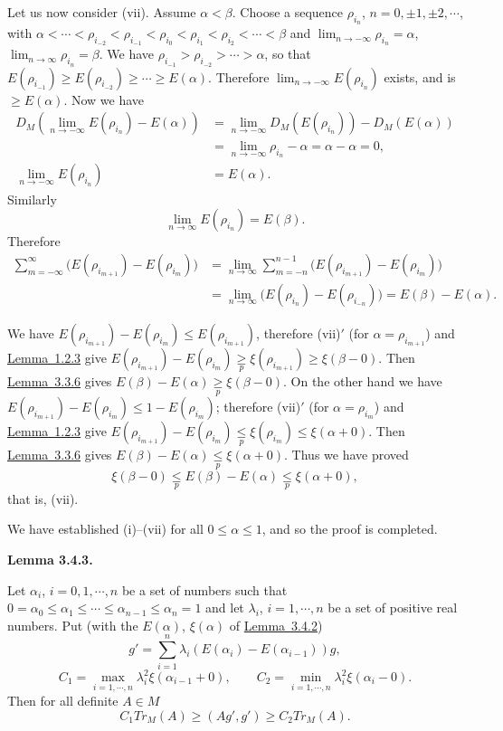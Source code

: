 \documentclass[twoside,leqno]{article}
\newcommand{\TrM}{Tr_M}
\newcommand{\StatementTarget}[1]{\phantomsection\hypertarget{stmt:#1}{}}
\newcommand{\StatementRef}[2]{\hyperlink{stmt:#1}{#2}}
\newenvironment{statement}[2]{%
  \par\medskip
  \noindent\StatementTarget{#1}\hspace*{\parindent}\textbf{#2.}\ \itshape\ignorespaces
}{\par}
\begin{document}
Let us now consider (vii). Assume $\alpha<\beta$. Choose a sequence
$\rho_{i_n}$, $n=0,\mathord\pm1,\mathord\pm2,\cdots$, with
\(\alpha<\cdots<\rho_{i_{-2}}<\rho_{i_{-1}}<\rho_{i_0}
<\rho_{i_1}<\rho_{i_2}<\cdots<\beta\)
and
\(\lim_{n\to-\infty}\rho_{i_n}=\alpha\),
\(\lim_{n\to\infty}\rho_{i_n}=\beta\).
We have $\rho_{i_{-1}}>\rho_{i_{-2}}>\cdots>\alpha$, so that
\(E(\rho_{i_{-1}})\geq E(\rho_{i_{-2}})\geq\cdots\geq E(\alpha)\).
Therefore $\lim_{n\to-\infty}E(\rho_{i_n})$ exists, and is
$\geq E(\alpha)$. Now we have
\begin{align*}
 D_M\left(\lim_{n\to-\infty}E(\rho_{i_n})-E(\alpha)\right)
 &=\lim_{n\to-\infty}D_M(E(\rho_{i_n}))-D_M(E(\alpha))\\
 &=\lim_{n\to-\infty}\rho_{i_n}-\alpha=\alpha-\alpha=0,\\
 \lim_{n\to-\infty}E(\rho_{i_n})&=E(\alpha).
\end{align*}
Similarly
\[
 \lim_{n\to\infty}E(\rho_{i_n})=E(\beta).
\]
Therefore
\begin{align*}
 \sum_{m=-\infty}^{\infty}
 \bigl(E(\rho_{i_{m+1}})-E(\rho_{i_m})\bigr)
 &=\lim_{n\to\infty}\sum_{m=-n}^{n-1}
 \bigl(E(\rho_{i_{m+1}})-E(\rho_{i_m})\bigr)\\
 &=\lim_{n\to\infty}\bigl(E(\rho_{i_n})-E(\rho_{i_{-n}})\bigr)
 =E(\beta)-E(\alpha).
\end{align*}

We have
$E(\rho_{i_{m+1}})-E(\rho_{i_m})\leq E(\rho_{i_{m+1}})$, therefore
(vii)$'$ (for $\alpha=\rho_{i_{m+1}}$) and
\StatementRef{lemma:1.2.3}{Lemma~1.2.3} give
\(E(\rho_{i_{m+1}})-E(\rho_{i_m})
\mathrel{\underset p{\geq}}\xi(\rho_{i_{m+1}})
\geq\xi(\beta-0)\).
Then \StatementRef{lemma:3.3.6}{Lemma~3.3.6} gives
\(E(\beta)-E(\alpha)\mathrel{\underset p{\geq}}\xi(\beta-0)\).
On the other hand we have
$E(\rho_{i_{m+1}})-E(\rho_{i_m})\leq1-E(\rho_{i_m})$; therefore
(vii)$'$ (for $\alpha=\rho_{i_m}$) and
\StatementRef{lemma:1.2.3}{Lemma~1.2.3} give
\(E(\rho_{i_{m+1}})-E(\rho_{i_m})
\mathrel{\underset p{\leq}}\xi(\rho_{i_m})
\leq\xi(\alpha+0)\).
Then \StatementRef{lemma:3.3.6}{Lemma~3.3.6} gives
\(E(\beta)-E(\alpha)\mathrel{\underset p{\leq}}\xi(\alpha+0)\).
Thus we have proved
\[
 \xi(\beta-0)\mathrel{\underset p{\leq}}E(\beta)-E(\alpha)
 \mathrel{\underset p{\leq}}\xi(\alpha+0),
\]
that is, (vii).

We have established (i)--(vii) for all $0\leq\alpha\leq1$, and so the
proof is completed.

\begin{statement}{lemma:3.4.3}{Lemma 3.4.3}
Let $\alpha_i$, $i=0,1,\cdots,n$ be a set of numbers such that
$0=\alpha_0\leq\alpha_1\leq\cdots\leq\alpha_{n-1}\leq\alpha_n=1$
and let $\lambda_i$, $i=1,\cdots,n$ be a set of positive real numbers. Put
(with the $E(\alpha)$, $\xi(\alpha)$ of
\StatementRef{lemma:3.4.2}{Lemma~3.4.2})
\[
 g'=\sum_{i=1}^n\lambda_i(E(\alpha_i)-E(\alpha_{i-1}))g,
\]
\[
 C_1=\max_{i=1,\cdots,n}\lambda_i^2\xi(\alpha_{i-1}+0),
 \qquad
 C_2=\min_{i=1,\cdots,n}\lambda_i^2\xi(\alpha_i-0).
\]
Then for all definite $A\in M$
\[
 C_1\TrM(A)\geq(Ag',g')\geq C_2\TrM(A).
\]
\end{statement}
\end{document}
